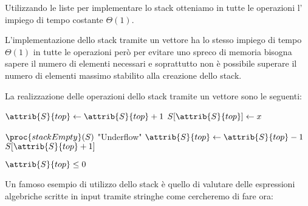 Utilizzando le liste per implementare lo stack otteniamo in tutte le operazioni l'
impiego di tempo costante $\Theta(1)$.

L'implementazione dello stack tramite un vettore ha lo stesso impiego di tempo $\Theta(1)$
in tutte le operazioni però per evitare uno spreco di memoria bisogna sapere il numero
di elementi necessari e soprattutto non è possibile superare il numero di elementi massimo
stabilito alla creazione dello stack.

La realizzazione delle operazioni dello stack tramite un vettore sono le seguenti:
\begin{codebox}
\li $\attrib{S}{top} \gets \attrib{S}{top} + 1$
\li $S[\attrib{S}{top}] \gets x$
\end{codebox}

\begin{codebox}
\li \If $\proc{stackEmpty}(S)$
\li \Then \Error "Underflow"
\li \Else $\attrib{S}{top} \gets \attrib{S}{top}-1$
\li \Return $S[\attrib{S}{top}+1]$
\end{codebox}

\begin{codebox}
\li \Return $\attrib{S}{top} \leq 0$
\end{codebox}

Un famoso esempio di utilizzo dello stack è quello di valutare delle espressioni
algebriche scritte in input tramite stringhe come cercheremo di fare ora:
